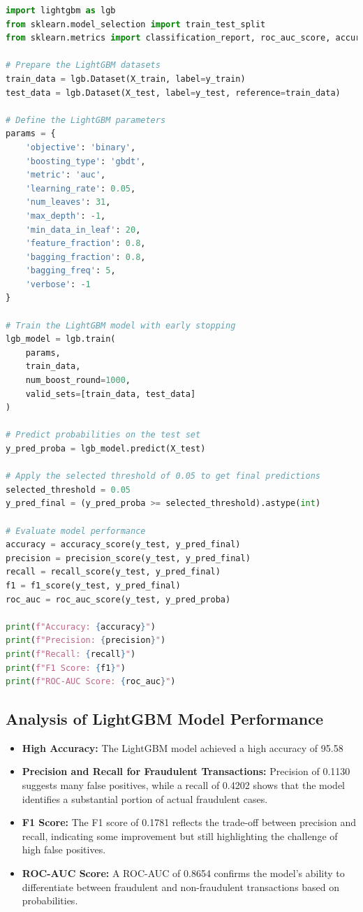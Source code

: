 \documentclass[12pt,a4paper]{report}
\begin{document}
\begin{lstlisting}[language=Python, caption={Training LightGBM Model}]
import lightgbm as lgb
from sklearn.model_selection import train_test_split
from sklearn.metrics import classification_report, roc_auc_score, accuracy_score, precision_score, recall_score, f1_score

# Prepare the LightGBM datasets
train_data = lgb.Dataset(X_train, label=y_train)
test_data = lgb.Dataset(X_test, label=y_test, reference=train_data)

# Define the LightGBM parameters
params = {
    'objective': 'binary',
    'boosting_type': 'gbdt',
    'metric': 'auc',
    'learning_rate': 0.05,
    'num_leaves': 31,
    'max_depth': -1,
    'min_data_in_leaf': 20,
    'feature_fraction': 0.8,
    'bagging_fraction': 0.8,
    'bagging_freq': 5,
    'verbose': -1
}

# Train the LightGBM model with early stopping
lgb_model = lgb.train(
    params,
    train_data,
    num_boost_round=1000,
    valid_sets=[train_data, test_data]
)

# Predict probabilities on the test set
y_pred_proba = lgb_model.predict(X_test)

# Apply the selected threshold of 0.05 to get final predictions
selected_threshold = 0.05
y_pred_final = (y_pred_proba >= selected_threshold).astype(int)

# Evaluate model performance
accuracy = accuracy_score(y_test, y_pred_final)
precision = precision_score(y_test, y_pred_final)
recall = recall_score(y_test, y_pred_final)
f1 = f1_score(y_test, y_pred_final)
roc_auc = roc_auc_score(y_test, y_pred_proba)

print(f"Accuracy: {accuracy}")
print(f"Precision: {precision}")
print(f"Recall: {recall}")
print(f"F1 Score: {f1}")
print(f"ROC-AUC Score: {roc_auc}")
\end{lstlisting}

\subsection{Analysis of LightGBM Model Performance}

\begin{itemize}
    \item \textbf{High Accuracy:} The LightGBM model achieved a high accuracy of 95.58%
    \item \textbf{Precision and Recall for Fraudulent Transactions:} Precision of 0.1130 suggests many false positives, while a recall of 0.4202 shows that the model identifies a substantial portion of actual fraudulent cases.
    \item \textbf{F1 Score:} The F1 score of 0.1781 reflects the trade-off between precision and recall, indicating some improvement but still highlighting the challenge of high false positives.
    \item \textbf{ROC-AUC Score:} A ROC-AUC of 0.8654 confirms the model's ability to differentiate between fraudulent and non-fraudulent transactions based on probabilities.
\end{itemize}
\end{document}
